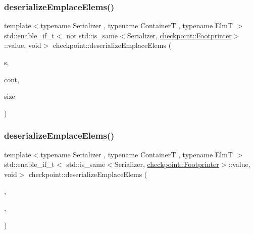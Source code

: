 \subsubsection{\texorpdfstring{deserialize\+Emplace\+Elems()}{deserializeEmplaceElems()}\hspace{0.1cm}{\footnotesize\ttfamily [1/2]}}
{\footnotesize\ttfamily template$<$typename Serializer , typename ContainerT , typename ElmT $>$ \\
std\+::enable\+\_\+if\+\_\+t$<$ not std\+::is\+\_\+same$<$Serializer, \hyperlink{structcheckpoint_1_1_footprinter}{checkpoint\+::\+Footprinter}$>$\+::value, void$>$ checkpoint\+::deserialize\+Emplace\+Elems (\begin{DoxyParamCaption}\item[{Serializer \&}]{s,  }\item[{ContainerT \&}]{cont,  }\item[{typename Container\+T\+::size\+\_\+type}]{size }\end{DoxyParamCaption})\hspace{0.3cm}{\ttfamily [inline]}}

\mbox{\label{namespacecheckpoint_ac1dd08a1833499b9b6a302934c0b4603}} 
\subsubsection{\texorpdfstring{deserialize\+Emplace\+Elems()}{deserializeEmplaceElems()}\hspace{0.1cm}{\footnotesize\ttfamily [2/2]}}
{\footnotesize\ttfamily template$<$typename Serializer , typename ContainerT , typename ElmT $>$ \\
std\+::enable\+\_\+if\+\_\+t$<$ std\+::is\+\_\+same$<$Serializer, \hyperlink{structcheckpoint_1_1_footprinter}{checkpoint\+::\+Footprinter}$>$\+::value, void$>$ checkpoint\+::deserialize\+Emplace\+Elems (\begin{DoxyParamCaption}\item[{Serializer \&}]{,  }\item[{ContainerT \&}]{,  }\item[{typename Container\+T\+::size\+\_\+type}]{ }\end{DoxyParamCaption})\hspace{0.3cm}{\ttfamily [inline]}}

